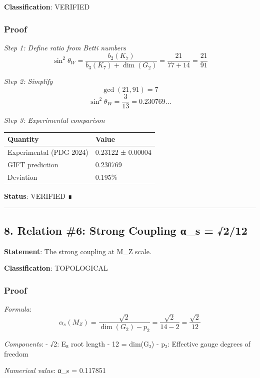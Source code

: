 \documentclass[11pt,a4paper]{article}
\begin{document}
\textbf{Classification}: VERIFIED

\subsubsection{Proof}\label{proof-3}

\emph{Step 1: Define ratio from Betti numbers}
\[\sin^2\theta_W = \frac{b_2(K_7)}{b_3(K_7) + \dim(G_2)} = \frac{21}{77 + 14} = \frac{21}{91}\]

\emph{Step 2: Simplify}
\[\gcd(21, 91) = 7\]
\[\sin^2\theta_W = \frac{3}{13} = 0.230769...\]

\emph{Step 3: Experimental comparison}

{\def\LTcaptype{none} %
\begin{longtable}[]{@{}ll@{}}
\toprule\noalign{}
Quantity & Value \\
\midrule\noalign{}
\endhead
\bottomrule\noalign{}
\endlastfoot
Experimental (PDG 2024) & 0.23122 ± 0.00004 \\
GIFT prediction & 0.230769 \\
Deviation & 0.195\% \\
\end{longtable}
}

\textbf{Status}: VERIFIED ∎

\begin{center}\rule{0.5\linewidth}{0.5pt}\end{center}

\subsection{8. Relation \#6: Strong Coupling α\_s = √2/12}\label{relation-6-strong-coupling-ux3b1_s-212}

\textbf{Statement}: The strong coupling at M\_Z scale.

\textbf{Classification}: TOPOLOGICAL

\subsubsection{Proof}\label{proof-4}

\emph{Formula}:
\[\alpha_s(M_Z) = \frac{\sqrt{2}}{\dim(G_2) - p_2} = \frac{\sqrt{2}}{14 - 2} = \frac{\sqrt{2}}{12}\]

\emph{Components}:
- √2: E₈ root length
- 12 = dim(G₂) - p₂: Effective gauge degrees of freedom

\emph{Numerical value}: α\_s = 0.117851
\end{document}
